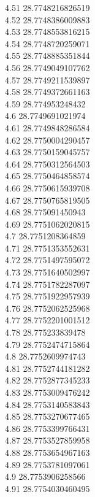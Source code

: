 {4.51	28.7748216826519\\
4.52	28.7748386009883\\
4.53	28.7748553816215\\
4.54	28.7748720259071\\
4.55	28.7748885351844\\
4.56	28.7749049107762\\
4.57	28.7749211539897\\
4.58	28.7749372661163\\
4.59	28.774953248432\\
4.6	28.7749691021974\\
4.61	28.7749848286584\\
4.62	28.7750004290457\\
4.63	28.7750159045757\\
4.64	28.7750312564503\\
4.65	28.7750464858574\\
4.66	28.7750615939708\\
4.67	28.7750765819505\\
4.68	28.775091450943\\
4.69	28.7751062020815\\
4.7	28.7751208364859\\
4.71	28.7751353552631\\
4.72	28.7751497595072\\
4.73	28.7751640502997\\
4.74	28.7751782287097\\
4.75	28.7751922957939\\
4.76	28.7752062525968\\
4.77	28.7752201001512\\
4.78	28.775233839478\\
4.79	28.7752474715864\\
4.8	28.7752609974743\\
4.81	28.7752744181282\\
4.82	28.7752877345233\\
4.83	28.7753009476242\\
4.84	28.7753140583843\\
4.85	28.7753270677465\\
4.86	28.7753399766431\\
4.87	28.7753527859958\\
4.88	28.7753654967163\\
4.89	28.7753781097061\\
4.9	28.7753906258566\\
4.91	28.7754030460495\\
}
